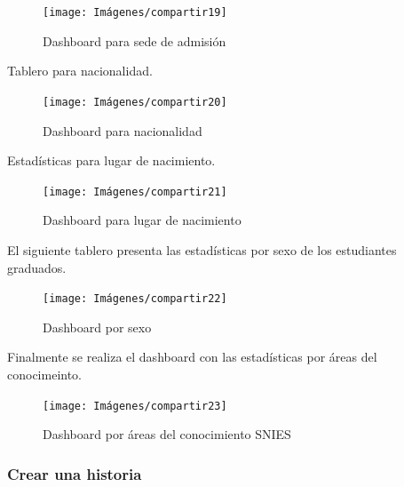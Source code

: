 \documentclass[
]{book}
\begin{document}
\begin{figure}

{\centering \texttt{[image: Imágenes/compartir19]} 

}

\caption{Dashboard para sede de admisión}\label{fig:tablerosedeadmision-fig}
\end{figure}

Tablero para nacionalidad.

\begin{figure}

{\centering \texttt{[image: Imágenes/compartir20]} 

}

\caption{Dashboard para nacionalidad}\label{fig:tableronacionalidad-fig}
\end{figure}

Estadísticas para lugar de nacimiento.

\begin{figure}

{\centering \texttt{[image: Imágenes/compartir21]} 

}

\caption{Dashboard para lugar de nacimiento}\label{fig:tablerolugardenacimiento-fig}
\end{figure}

El siguiente tablero presenta las estadísticas por sexo de los estudiantes graduados.

\begin{figure}

{\centering \texttt{[image: Imágenes/compartir22]} 

}

\caption{Dashboard por sexo}\label{fig:tablerosexo-fig}
\end{figure}

Finalmente se realiza el dashboard con las estadísticas por áreas del conocimeinto.

\begin{figure}

{\centering \texttt{[image: Imágenes/compartir23]} 

}

\caption{Dashboard por áreas del conocimiento SNIES}\label{fig:tableroareasconocimiento-fig}
\end{figure}

\hypertarget{crear-una-historia}{%
\subsubsection{Crear una historia}\label{crear-una-historia}}
\end{document}
